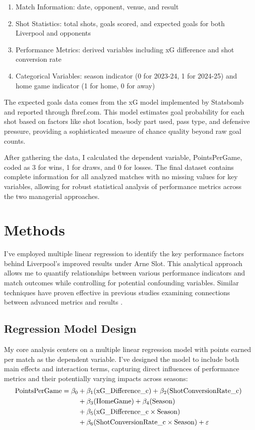 \documentclass[12pt]{article}
\begin{document}
\begin{enumerate}
\item Match Information: date, opponent, venue, and result
\item Shot Statistics: total shots, goals scored, and expected goals for both Liverpool and opponents
\item Performance Metrics: derived variables including xG difference and shot conversion rate
\item Categorical Variables: season indicator (0 for 2023-24, 1 for 2024-25) and home game indicator (1 for home, 0 for away)
\end{enumerate}

The expected goals data comes from the xG model implemented by Statsbomb and reported through fbref.com. This model estimates goal probability for each shot based on factors like shot location, body part used, pass type, and defensive pressure, providing a sophisticated measure of chance quality beyond raw goal counts.

After gathering the data, I calculated the dependent variable, PointsPerGame, coded as 3 for wins, 1 for draws, and 0 for losses. The final dataset contains complete information for all analyzed matches with no missing values for key variables, allowing for robust statistical analysis of performance metrics across the two managerial approaches.

\section*{Methods}

I've employed multiple linear regression to identify the key performance factors behind Liverpool's improved results under Arne Slot. This analytical approach allows me to quantify relationships between various performance indicators and match outcomes while controlling for potential confounding variables. Similar techniques have proven effective in previous studies examining connections between advanced metrics and results \citep{anzer2023}.

\subsection*{Regression Model Design}

My core analysis centers on a multiple linear regression model with points earned per match as the dependent variable. I've designed the model to include both main effects and interaction terms, capturing direct influences of performance metrics and their potentially varying impacts across seasons:
\begin{align}
\text{PointsPerGame} = \beta_0 &+ \beta_1(\text{xG\_Difference\_c}) + \beta_2(\text{ShotConversionRate\_c}) \notag \\
&+ \beta_3(\text{HomeGame}) + \beta_4(\text{Season}) \notag \\
&+ \beta_5(\text{xG\_Difference\_c} \times \text{Season}) \notag \\
&+ \beta_6(\text{ShotConversionRate\_c} \times \text{Season}) + \varepsilon
\end{align}
\end{document}

